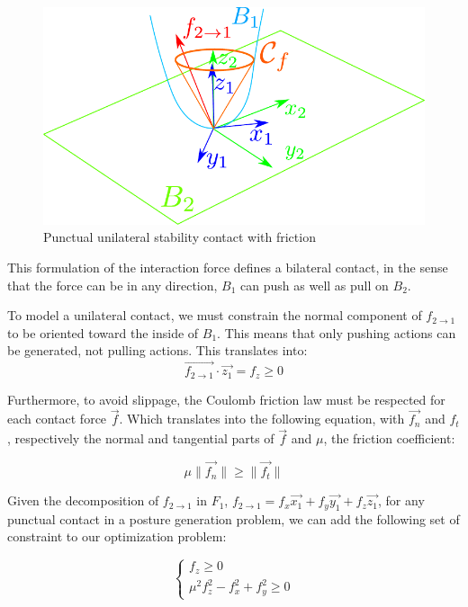 \begin{figure}[htpb]
  \centering
  \includegraphics[width=0.6\linewidth]{frictionCone.pdf}
  \caption{Punctual unilateral stability contact with friction}
\label{fig:frictionCone}
\end{figure}

This formulation of the interaction force defines a bilateral contact, in the sense that the force can be in any direction, $B_1$ can push as well as pull on $B_2$.

To model a unilateral contact, we must constrain the normal component of $f_{2\rightarrow 1}$ to be oriented toward the inside of $B_1$.
This means that only pushing actions can be generated, not pulling actions.
This translates into:
\begin{equation}
  \overrightarrow{f_{2\rightarrow 1}}\cdot \vec{z_1} = f_z \geq 0
\end{equation}

Furthermore, to avoid slippage, the Coulomb friction law must be respected for each contact force $\vec{f}$.
Which translates into the following equation, with $\vec{f_n}$ and $f_t$, respectively the normal and tangential parts of $\vec{f}$ and $\mu$, the friction coefficient:

\begin{equation}
  \mu\|\vec{f_n}\| \geq \|\vec{f_t}\|
\end{equation}

Given the decomposition of $f_{2\rightarrow 1}$ in $F_1$, $f_{2\rightarrow 1} = f_x \vec{x_1} + f_y \vec{y_1} + f_z \vec{z_1}$, for any punctual contact in a posture generation problem, we can add the following set of constraint to our optimization problem:

\begin{equation}
  \label{eq:unilateralContact}
  \left\{
  \begin{array}{l}
    f_z \geq 0 \\
    \mu^2 f_z^2 - f_x^2 +f_y^2 \geq 0
  \end{array}
  \right.
\end{equation}

